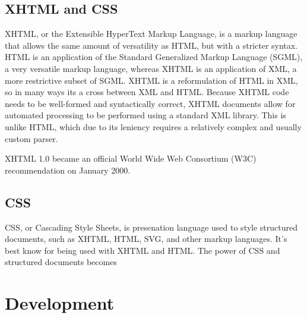 \documentclass[a4paper,12pt]{report}
\begin{document}
\section{XHTML and CSS}
XHTML, or the Extensible HyperText Markup Language, is a markup language that allows the same amount of versatility as HTML, but with a stricter syntax. 
HTML is an application of the Standard Generalized Markup Language (SGML), a very versatile markup language, whereas XHTML is an application of XML, a more restrictive subset of SGML. 
XHTML is a reformulation of HTML in XML, so in many ways its a cross between XML and HTML. 
Because XHTML code needs to be well-formed and syntactically correct, XHTML documents allow for automated processing to be performed using a standard XML library. 
This is unlike HTML, which due to its leniency requires a relatively complex and usually custom parser. 


XHTML 1.0 became an official World Wide Web Consortium (W3C) recommendation on January 2000. 


\section {CSS}
CSS, or Cascading Style Sheets, is presenation language used to style structured documents, such as XHTML, HTML, SVG, and other markup languages. 
It's best know for being used with XHTML and HTML. 
The power of CSS and structured documents becomes 


\chapter{Development}
\end{document}
